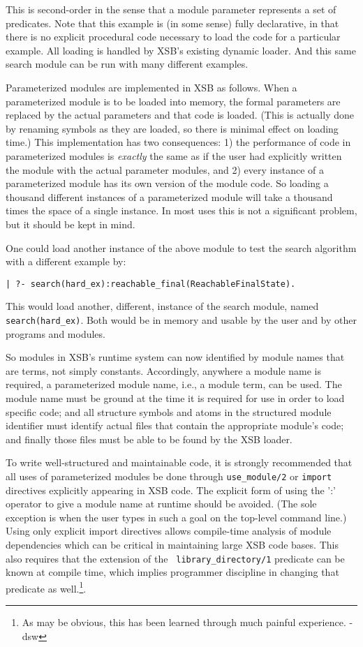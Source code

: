 This is second-order in the sense that a module parameter represents a
set of predicates.  Note that this example is (in some sense) fully
declarative, in that there is no explicit procedural code necessary to
load the code for a particular example.  All loading is handled by
XSB's existing dynamic loader.  And this same search module can be
run with many different examples.

Parameterized modules are implemented in XSB as follows.  When a
parameterized module is to be loaded into memory, the formal
parameters are replaced by the actual parameters and that code is
loaded.  (This is actually done by renaming symbols as they are
loaded, so there is minimal effect on loading time.)  This
implementation has two consequences: 1) the performance of code in
parameterized modules is {\em exactly} the same as if the user had
explicitly written the module with the actual parameter modules, and
2) every instance of a parameterized module has its own version of the
module code.  So loading a thousand different instances of a
parameterized module will take a thousand times the space of a single
instance.  In most uses 
this is not a significant problem, but it should be kept in mind.

One could load another instance of the above module to test the search
algorithm with a different example by:
\begin{verbatim}
| ?- search(hard_ex):reachable_final(ReachableFinalState).
\end{verbatim}
This would load another, different, instance of the search module,
named {\tt search(hard\_ex)}.  Both would be in memory and usable by
the user and by other programs and modules.

So modules in XSB's runtime system can now identified by module names
that are terms, not simply constants. Accordingly, anywhere a module
name is required, a parameterized module name, i.e., a module term,
can be used.  The module name must be ground at the time it is
required for use in order to load specific code; and all structure
symbols and atoms in the structured module identifier must identify
actual files that contain the appropriate module's code; and finally
those files must be able to be found by the XSB loader.

To write well-structured and maintainable code, it is strongly
recommended that all uses of parameterized modules be done through
{\tt use\_module/2} or {\tt import} directives explicitly appearing in
XSB code.  The explicit form of using the ':' operator to give a
module name at runtime should be avoided.  (The sole exception is when
the user types in such a goal on the top-level command line.)  Using
only explicit import directives allows compile-time analysis of module
dependencies which can be critical in maintaining large XSB code
bases. This also requires that the extension of the {\tt
  library\_directory/1} predicate can be known at compile time, which
implies programmer discipline in changing that predicate as
well.\footnote{As may be obvious, this has been learned through much
  painful experience. -dsw}.

